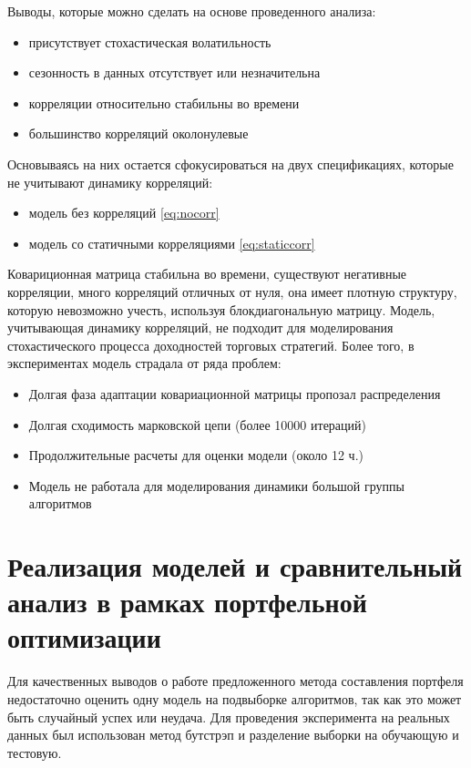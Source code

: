 Выводы, которые можно сделать на основе проведенного анализа:
\begin{itemize}
	\item присутствует стохастическая волатильность
	\item сезонность в данных отсутствует или незначительна
	\item корреляции относительно стабильны во времени
	\item большинство корреляций околонулевые
\end{itemize}

Основываясь на них остается сфокусироваться на двух спецификациях, которые не учитывают динамику корреляций:
\begin{itemize}
	\item модель без корреляций \eqref{eq:nocorr}
	\item модель со статичными корреляциями \eqref{eq:staticcorr}
\end{itemize}

Ковариционная матрица стабильна во времени, существуют негативные корреляции, много корреляций отличных от нуля, она имеет плотную структуру, которую невозможно учесть, используя блокдиагональную матрицу. Модель, учитывающая динамику корреляций, не подходит для моделирования стохастического процесса доходностей торговых стратегий. Более того, в экспериментах модель страдала от ряда проблем:
\begin{itemize}
	\item Долгая фаза адаптации ковариационной матрицы пропозал распределения
	\item Долгая сходимость марковской цепи (более 10000 итераций)
	\item Продолжительные расчеты для оценки модели (около 12 ч.)
	\item Модель не работала для моделирования динамики большой группы алгоритмов
\end{itemize}

\section{Реализация моделей и сравнительный анализ в рамках портфельной оптимизации}
Для качественных выводов о работе предложенного метода составления портфеля недостаточно оценить одну модель на подвыборке алгоритмов, так как это может быть случайный успех или неудача. Для проведения эксперимента на реальных данных был использован метод бутстрэп \citep{grimshaw1995} и разделение выборки на обучающую и тестовую. 

